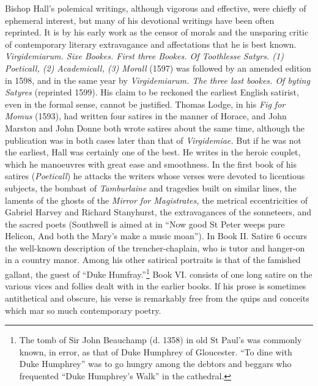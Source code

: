 Bishop Hall's polemical writings, although vigorous and effective, were chiefly of ephemeral interest, but many of his devotional writings have been often reprinted. It is by his early work as the censor of morals and the unsparing critic of contemporary literary extravagance and affectations that he is best known. \emph{Virgidemiarum. Sixe Bookes. First three Bookes. Of Toothlesse Satyrs. (1) Poeticall, (2) Academicall, (3) Morall} (1597) was followed by an amended edition in 1598, and in the same year by \emph{Virgidemiarum. The three last bookes. Of byting Satyres} (reprinted 1599). His claim to be reckoned the earliest English satirist, even in the formal sense, cannot be justified. Thomas Lodge, in his \emph{Fig for Momus} (1593), had written four satires in the manner of Horace, and John Marston and John Donne both wrote satires about the same time, although the publication was in both cases later than that of \emph{Virgidemiae.} But if he was not the earliest, Hall was certainly one of the best. He writes in the heroic couplet, which he manoeuvres with great ease and smoothness. In the first book of his satires (\emph{Poeticall}) he attacks the writers whose verses were devoted to licentious subjects, the bombast of \emph{Tamburlaine} and tragedies built on similar lines, the laments of the ghosts of the \emph{Mirror for Magistrates,} the metrical eccentricities of Gabriel Harvey and Richard Stanyhurst, the extravagances of the sonneteers, and the sacred poets (Southwell is aimed at in ``Now good St Peter weeps pure Helicon, And both the Mary's make a music moan''). In Book II. Satire 6 occurs the well-known description of the trencher-chaplain, who is tutor and hanger-on in a country manor. Among his other satirical portraits is that of the famished gallant, the guest of ``Duke Humfray.''\footnote{The tomb of Sir John Beauchamp (d. 1358) in old St Paul's was commonly known, in error, as that of Duke Humphrey of Gloucester. ``To dine with Duke Humphrey'' was to go hungry among the debtors and beggars who frequented ``Duke Humphrey's Walk'' in the cathedral.} Book VI. consists of one long satire on the various vices and follies dealt with in the earlier books. If his prose is sometimes antithetical and obscure, his verse is remarkably free from the quips and conceits which mar so much contemporary poetry.


